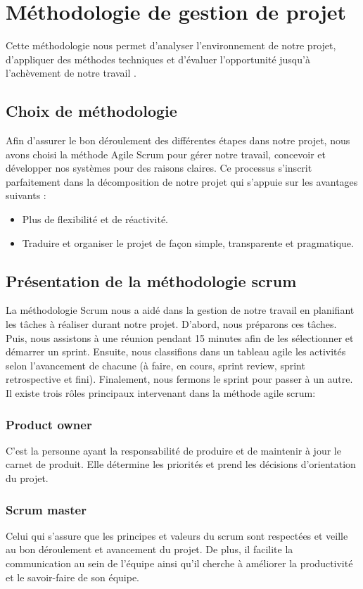 	
	
\section[Methodologie]{Méthodologie de gestion de projet }
Cette méthodologie nous permet d'analyser l'environnement de notre projet, d'appliquer des méthodes techniques et d'évaluer l'opportunité jusqu'à l'achèvement de notre travail .
\subsection{Choix de méthodologie }
Afin d'assurer le bon déroulement des différentes étapes dans notre projet, nous avons choisi la méthode Agile Scrum pour gérer notre travail, concevoir et développer nos systèmes pour des raisons claires. Ce processus  s'inscrit parfaitement dans la décomposition de notre projet qui s'appuie sur les avantages suivants :
\begin{itemize}
	\item Plus de flexibilité et de réactivité.
	\item Traduire et organiser le projet de façon simple, transparente et pragmatique.
\end{itemize}

\subsection{Présentation de la méthodologie scrum }
La méthodologie Scrum nous a aidé dans la gestion de notre travail en planifiant les tâches à réaliser durant notre projet. D'abord, nous préparons ces tâches. Puis, nous assistons à une réunion pendant 15 minutes afin de les sélectionner et démarrer un sprint. Ensuite, nous classifions dans un tableau agile les activités selon l'avancement de chacune (à faire, en cours, sprint review, sprint retrospective et fini). Finalement, nous fermons le sprint pour passer à un autre.
Il existe trois rôles principaux intervenant dans la méthode agile scrum:
\subsubsection{Product owner }
C'est la personne ayant la responsabilité de produire et de maintenir à jour le carnet de produit. Elle détermine les priorités et prend les décisions d'orientation du projet.
\subsubsection{Scrum master  }
Celui qui s’assure que les principes et valeurs du scrum sont
respectées et veille au bon déroulement et avancement du projet. De plus, il facilite la communication au sein de l’équipe ainsi qu'il cherche à améliorer la productivité et le savoir-faire de son équipe.
